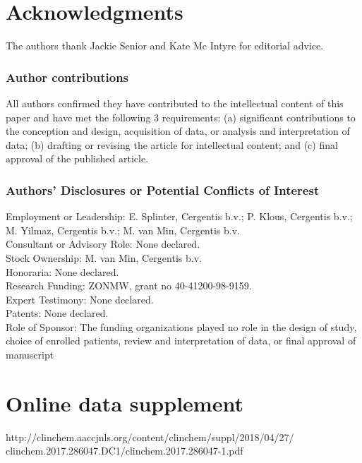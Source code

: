 \section*{Acknowledgments}\label{Acknowledgments} 
The authors thank Jackie Senior and Kate Mc Intyre for editorial advice.

\subsubsection{Author contributions}
All authors confirmed they have contributed to the intellectual content of this paper and have met the following 3 requirements: (a) significant contributions to the conception and design, acquisition of data, or analysis and interpretation of data; (b) drafting or revising the article for intellectual content; and (c) final approval of the published article.

\subsubsection{Authors’ Disclosures or Potential Conflicts of Interest} 
Employment or Leadership: E. Splinter, Cergentis b.v.; P. Klous, Cergentis b.v.; M. Yilmaz, Cergentis b.v.; M. van Min, Cergentis b.v. \\
Consultant or Advisory Role: None declared. \\
Stock Ownership: M. van Min, Cergentis b.v. \\
Honoraria: None declared. \\
Research Funding: ZONMW, grant no 40-41200-98-9159. \\
Expert Testimony: None declared. \\
Patents: None declared.\\
Role of Sponsor: The funding organizations played no role in the design of study, choice of enrolled patients, review and interpretation of data, or final approval of manuscript

\section*{Online data supplement}\label{Online data supplement}
http://clinchem.aaccjnls.org/content/clinchem/suppl/2018/04/27/\\clinchem.2017.286047.DC1/clinchem.2017.286047-1.pdf

